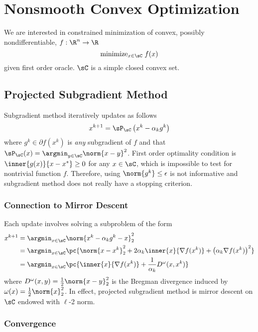 \documentclass[../summary.tex]{subfiles}
\begin{document}
\section{Nonsmooth Convex Optimization}

We are interested in constrained minimization of convex, possibly nondifferentiable, $f:\R^n \to \R$ 
\[
    \text{minimize}_{x\in \sC}\; f(x)
\]
given first order oracle. $\sC$ is a simple closed convex set.

\subsection{Projected Subgradient Method}

Subgradient method iteratively updates as follows
\[
    x^{k+1}
        = \sP_{\sC}\left( x^k - \alpha_k g^k  \right)
\]
where $g^k \in\partial f(x^k)$ is \textit{any} subgradient of $f$ and that $\sP_{\sC}(x) = \argmin_{y\in\sC} \norm{x-y}^2$. First order optimality condition is $\inner{g(x)}{x-x^*} \geq 0$ for any $x\in\sC$, which is impossible to test for nontrivial function $f$. Therefore, using $\norm{g^k}\leq \epsilon$ is not informative and subgradient method does not really have a stopping criterion.

\subsubsection{Connection to Mirror Descent}

Each update involves solving a subproblem of the form
\begin{align}
    x^{k+1}
        &= \argmin_{x\in\sC} \norm{ x^k - \alpha_k g^k - x }_2^2 
            \nonumber \\
        &= \argmin_{x\in\sC} \pc{
            \norm{x-x^k}_2^2 + 2\alpha_k \inner{x}{\nabla f(x^k)} + \left( \alpha_k \nabla f(x^k) \right)^2
        } 
            \nonumber \\
        &= \argmin_{x\in\sC} \pc{
            \inner{x}{\nabla f(x^k)} + \frac{1}{\alpha_k} D^{\omega}(x,x^k)
        }
            \label{eq:subgradient_connection_to_mirror_descent}
\end{align}
where $D^{\omega}(x,y) = \frac{1}{2}\norm{x-y}_2^2$ is the Bregman divergence induced by $\omega(x)=\frac{1}{2}\norm{x}_2^2$. In effect, projected subgradient method is mirror descent on $\sC$ endowed with $\ell$-2 norm.

\subsubsection{Convergence}
\end{document}
